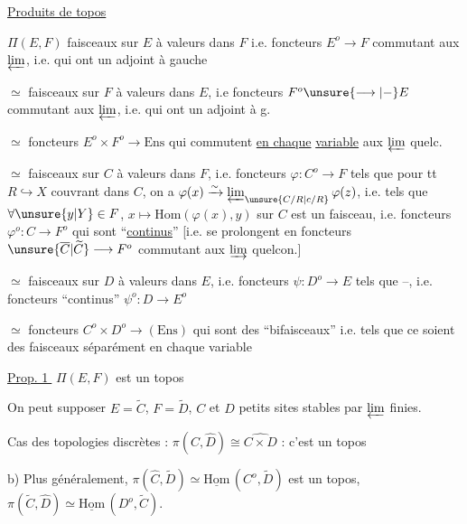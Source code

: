 \uline{Produits de topos}

$\Pi(E,F)$ \unsure{$=$|$\simeq$} faisceaux sur $E$ à valeurs dans $F$ i.e. foncteurs $E^o\to F$ commutant aux $\varprojlim$, i.e. qui ont un adjoint à gauche

$\simeq$ faisceaux sur $F$ à valeurs dans $E$, i.e foncteurs $F^o\unsure{\longrightarrow|-}E$ commutant aux $\varprojlim$, i.e. qui ont un adjoint à g.

$\simeq$ foncteurs $E^o\times F^o\longrightarrow\mathrm{Ens}$ qui commutent \uline{en chaque} \uline{variable} aux $\varprojlim$ quelc.


$\simeq$ faisceaux sur $C$ à valeurs dans $F$, i.e. foncteurs $\varphi\colon C^o\longrightarrow F$ tels que pour tt $R\hookrightarrow X$ couvrant dans $C$, on a $\varphi(x)\xrightarrow{\sim}\varprojlim_{\unsure{C/R|c/R}}\varphi(z)$, i.e. tels que $\forall\unsure{y|Y}\in F$, $x\mapsto\mathrm{Hom}(\varphi(x),y)$ sur $C$ est un faisceau,  i.e. foncteurs $\varphi^o\colon C\to F^o$ qui sont ``\uline{continus}'' [i.e. se prolongent en foncteurs $\unsure{\overline C|\widetilde C}\longrightarrow F^o$ commutant aux $\varinjlim$ quelcon.]


$\simeq$ faisceaux sur $D$ à valeurs dans $E$, i.e. foncteurs $\psi\colon D^o\longrightarrow E$ tels que --, i.e. foncteurs ``continus'' $\psi^o\colon D\to E^o$

$\simeq$ foncteurs $C^o\times D^o\longrightarrow(\mathrm{Ens})$ qui sont des ``bifaisceaux'' i.e. tels que ce soient des faisceaux séparément en chaque variable


\uline{Prop. \textcircled{1}} \quad $\Pi(E,F)$ est un topos

On peut supposer $E=\widetilde C$, $F=\widetilde D$, $C$ et $D$ petits sites stables par $\varprojlim$ finies.

 Cas des topologies discrètes : $\pi(\widehat C,\widehat D)\cong\widehat{C\times D}$ : c'est un topos

b) Plus généralement, $\pi(\widehat C,\widetilde D)\simeq\underline{\mathrm{Hom}}\,(C^o,\widetilde D)$ est un topos,  $\pi(\widetilde C,\widehat D)\simeq\underline{\mathrm{Hom}}\,(D^o,\widetilde C)$.

